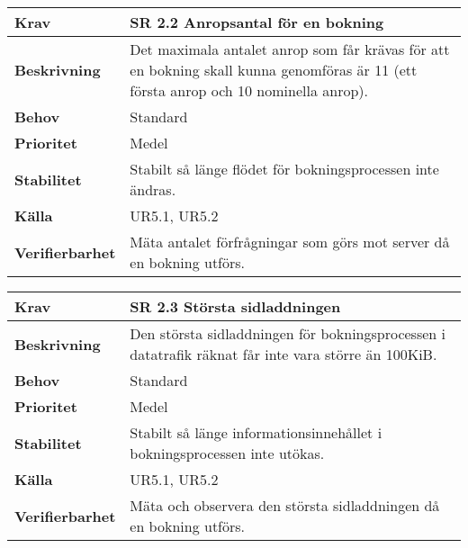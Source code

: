 \documentclass[a4paper, twoside, 11pt, titlepage]{article}
\begin{document}
\begin{tabular} { p{2.6cm} p{12.5cm} }
	\hline
	\sffamily\textbf{Krav} & \sffamily\textbf{SR 2.2 Anropsantal för en bokning } \\
	\hline
	\sffamily\textbf{Beskrivning} & Det maximala antalet anrop som får krävas för att en bokning skall kunna genomföras är 11 (ett första anrop och 10 nominella anrop).  \\
	\hline
	\sffamily\textbf{Behov} & Standard  \\
	\hline
	\sffamily\textbf{Prioritet} & Medel  \\
	\hline
	\sffamily\textbf{Stabilitet} & Stabilt så länge flödet för bokningsprocessen inte ändras.  \\
	\hline
	\sffamily\textbf{Källa} & UR5.1, UR5.2  \\
	\hline
	\sffamily\textbf{Verifierbarhet} & Mäta antalet förfrågningar som görs mot server då en bokning utförs.  \\
	\hline
\end{tabular}
\vspace{6mm}

\begin{tabular} { p{2.6cm} p{12.5cm} }
	\hline
	\sffamily\textbf{Krav} & \sffamily\textbf{SR 2.3 Största sidladdningen } \\
	\hline
	\sffamily\textbf{Beskrivning} & Den största sidladdningen för bokningsprocessen i datatrafik räknat får inte vara större än 100KiB.  \\
	\hline
	\sffamily\textbf{Behov} & Standard  \\
	\hline
	\sffamily\textbf{Prioritet} & Medel  \\
	\hline
	\sffamily\textbf{Stabilitet} & Stabilt så länge informationsinnehållet i bokningsprocessen inte utökas.  \\
	\hline
	\sffamily\textbf{Källa} & UR5.1, UR5.2  \\
	\hline
	\sffamily\textbf{Verifierbarhet} & Mäta och observera den största sidladdningen då en bokning utförs.  \\
	\hline
\end{tabular}
\vspace{6mm}
\end{document}
